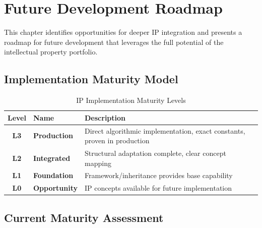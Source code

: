 
\chapter{Future Development Roadmap}
\label{chap:future-roadmap}

This chapter identifies opportunities for deeper IP integration and presents a roadmap for future development that leverages the full potential of the intellectual property portfolio.

\section{Implementation Maturity Model}

\begin{table}[H]
\centering
\caption{IP Implementation Maturity Levels}
\label{tab:maturity-levels}
\begin{tabularx}{\textwidth}{@{}clX@{}}
\toprule
\textbf{Level} & \textbf{Name} & \textbf{Description} \\
\midrule
\textcolor{green!60!black}{\textbf{L3}} & \textbf{Production} & Direct algorithmic implementation, exact constants, proven in production \\
\textcolor{blue!60!black}{\textbf{L2}} & \textbf{Integrated} & Structural adaptation complete, clear concept mapping \\
\textcolor{orange!70!black}{\textbf{L1}} & \textbf{Foundation} & Framework/inheritance provides base capability \\
\textcolor{purple!60!black}{\textbf{L0}} & \textbf{Opportunity} & IP concepts available for future implementation \\
\bottomrule
\end{tabularx}
\end{table}

\section{Current Maturity Assessment}

